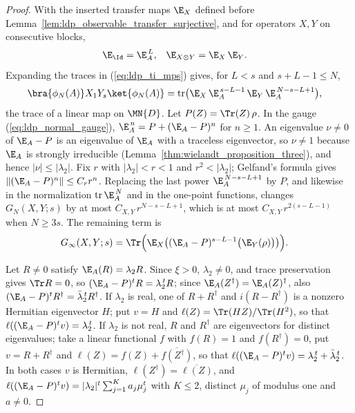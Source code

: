 \begin{proof}
    \leanok
    With the inserted transfer maps $\E_X$ defined before
    Lemma~\ref{lem:ldp_observable_transfer_surjective}, and for operators
    $X,Y$ on consecutive blocks,
    \begin{align}
        \E_{\Id} & =\E_A^{\,L},
                 &
        \E_{X\otimes Y}
                 & =\E_X\,\E_Y.
        \notag
    \end{align}
    Expanding the traces in (\ref{eq:ldp_ti_mps})
    gives, for $L<s$ and $s+L-1\le N$,
    \begin{align}
        \bra{\phi_N(A)}X_1Y_s\ket{\phi_N(A)}
         & =\operatorname{tr}\bigl(\E_X\,\E_A^{\,s-L-1}\,\E_Y\,
        \E_A^{\,N-s-L+1}\bigr),
        \notag
    \end{align}
    the trace of a linear map on $\MN{D}$. Let $P(Z)=\Tr(Z)\,\rho$. In the
    gauge (\ref{eq:ldp_normal_gauge}), $\E_A^{\,n}=P+(\E_A-P)^n$ for $n\ge1$.
    An eigenvalue $\nu\neq0$ of $\E_A-P$ is an eigenvalue of $\E_A$ with a
    traceless eigenvector, so $\nu\neq1$ because $\E_A$ is strongly
    irreducible (Lemma~\ref{thm:wielandt_proposition_three}), and hence
    $\lvert\nu\rvert\le\lvert\lambda_2\rvert$. Fix $r$ with
    $\lvert\lambda_2\rvert<r<1$ and $r^2<\lvert\lambda_2\rvert$; Gelfand's
    formula gives $\lVert(\E_A-P)^n\rVert\le C_rr^n$. Replacing the last power
    $\E_A^{\,N-s-L+1}$ by $P$, and likewise in the normalization
    $\operatorname{tr}\E_A^{\,N}$ and in the one-point functions, changes
    $G_N(X,Y;s)$ by at most $C_{X,Y}\,r^{N-s-L+1}$, which is at most
    $C_{X,Y}\,r^{2(s-L-1)}$ when $N\ge3s$. The remaining term is
    \begin{align}
        G_\infty(X,Y;s)
         & =\Tr\Bigl(\E_X\bigl((\E_A-P)^{s-L-1}\bigl(\E_Y(\rho)\bigr)\bigr)\Bigr).
        \label{eq:ldp_limit_correlator}
    \end{align}

    Let $R\neq0$ satisfy $\E_A(R)=\lambda_2R$. Since $\xi>0$,
    $\lambda_2\neq0$, and trace preservation gives $\Tr R=0$, so
    $(\E_A-P)^tR=\lambda_2^{\,t}R$; since $\E_A(Z^\dagger)=\E_A(Z)^\dagger$,
    also $(\E_A-P)^tR^\dagger=\bar\lambda_2^{\,t}R^\dagger$. If $\lambda_2$ is
    real, one of $R+R^\dagger$ and $i(R-R^\dagger)$ is a nonzero Hermitian
    eigenvector $H$; put $v=H$ and $\ell(Z)=\Tr(HZ)/\Tr(H^2)$, so that
    $\ell((\E_A-P)^tv)=\lambda_2^{\,t}$. If $\lambda_2$ is not real, $R$ and
    $R^\dagger$ are eigenvectors for distinct eigenvalues; take a linear
    functional $f$ with $f(R)=1$ and $f(R^\dagger)=0$, put $v=R+R^\dagger$ and
    $\ell(Z)=f(Z)+\overline{f(Z^\dagger)}$, so that
    $\ell((\E_A-P)^tv)=\lambda_2^{\,t}+\bar\lambda_2^{\,t}$. In both cases
    $v$ is Hermitian, $\ell(Z^\dagger)=\overline{\ell(Z)}$, and
    $\ell((\E_A-P)^tv)=\lvert\lambda_2\rvert^t\sum_{j=1}^Ka_j\mu_j^t$ with
    $K\le2$, distinct $\mu_j$ of modulus one and $a\neq0$.


\end{proof}
